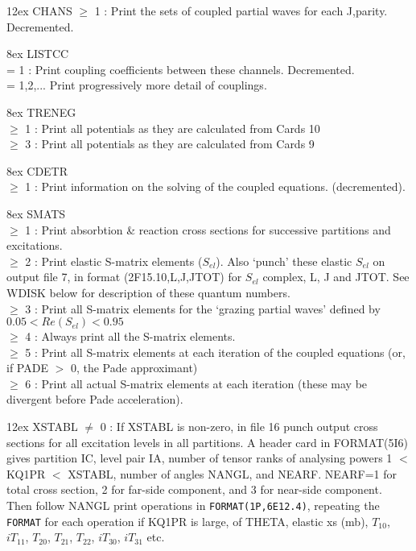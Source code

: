 \documentclass[11pt]{article}
\begin{document}
\bigskip

\hangindent 12ex
CHANS  $\geq$ 1 : Print the sets of coupled partial waves for each J,parity.
Decremented.

\hangindent 8ex  LISTCC
\\  = 1 : Print coupling coefficients between these channels. Decremented.
\\  = 1,2,... Print progressively more detail of couplings.



\hangindent 8ex  TRENEG
\\  $\geq$ 1 : Print all potentials as they are calculated from Cards 10
\\  $\geq$ 3 : Print all potentials as they are calculated from Cards 9



\hangindent 8ex  CDETR
\\  $\geq$ 1 : Print information on the solving of the coupled equations.
(decremented).

\hangindent 8ex
SMATS
\\  $\geq$ 1 : Print absorbtion \& reaction cross sections for successive
partitions and excitations.
\\  $\geq$ 2 : Print elastic S-matrix elements ($S_{el}$).
Also `punch' these elastic $S_{el}$ on output file 7,
in format (2F15.10,L,J,JTOT) for $S_{el}$ complex, L, J and JTOT.
See WDISK below for description of these quantum numbers.
\\  $\geq$ 3 : Print all S-matrix elements for the `grazing partial waves'
defined by $0.05 < Re(S_{el}) < 0.95$
\\  $\geq$ 4 : Always print all the S-matrix elements.
\\  $\geq$ 5 : Print all S-matrix elements at each iteration of the coupled
equations (or, if PADE  $>$ 0, the Pade approximant)
\\  $\geq$ 6 : Print all actual S-matrix elements at each iteration (these
may be divergent before Pade acceleration).





\hangindent 12ex
XSTABL $\neq$ 0 : If XSTABL is non-zero, in file 16 punch output cross sections
for all excitation levels in all partitions.
A header card in FORMAT(5I6) gives partition IC, level pair IA,
number of tensor ranks of analysing powers 1 $<$ KQ1PR $<$ XSTABL,
number of angles NANGL, and NEARF.  NEARF=1 for total cross section,
2 for far-side component, and 3 for near-side component.
\\
Then follow NANGL print operations in
{\tt FORMAT(1P,6E12.4)}, repeating
the {\tt FORMAT} for each operation if KQ1PR is large,
of THETA, elastic xs (mb), $T_{10}$, $iT_{11}$,
$T_{20}$, $ T_{21}$, $ T_{22}$, $ iT_{30}$, $ iT_{31}$
etc.
\end{document}
